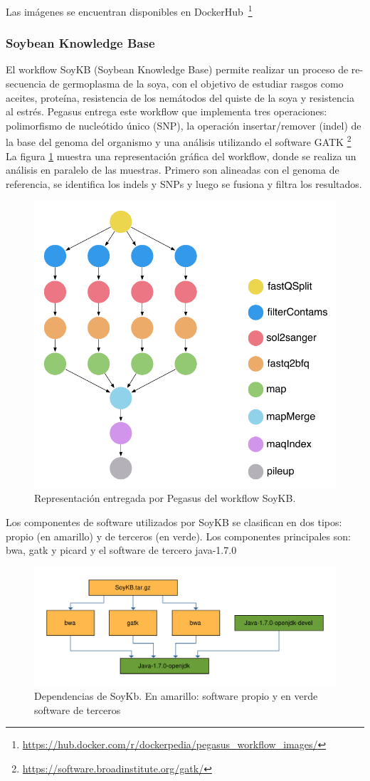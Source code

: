 Las imágenes se encuentran disponibles en DockerHub~\footnote{\url{https://hub.docker.com/r/dockerpedia/pegasus_workflow_images/}}

\subsubsection{Soybean Knowledge Base}

El workflow SoyKB (Soybean Knowledge Base) \cite{joshi2012soybean} permite realizar un proceso de re-secuencia de germoplasma de la soya, con el objetivo de estudiar rasgos como aceites, proteína, resistencia de los nemátodos del quiste de la soya y resistencia al estrés.
Pegasus entrega este workflow que implementa tres operaciones: polimorfismo de nucleótido único (SNP), la operación insertar/remover (indel) de la base del genoma del organismo y una análisis utilizando el software GATK \footnote{\url{https://software.broadinstitute.org/gatk/}}
La figura \ref{fig:soykb} muestra una representación gráfica del workflow, donde se realiza un análisis en paralelo de las muestras. Primero son alineadas con el genoma de referencia,  se identifica los indels y SNPs y luego se fusiona y filtra los resultados. 

\begin{figure}[t]
\centering
\includegraphics[width=.5\textwidth]{Figures/workflow-genome}
\caption{Representación entregada por Pegasus del workflow SoyKB.}\label{fig:soykb}
\end{figure}

Los componentes de software utilizados por SoyKB se clasifican en dos tipos: propio (en amarillo) y de terceros (en verde). Los componentes principales son: bwa, gatk y picard y el software de tercero java-1.7.0

\begin{figure}[t]
\centering
\includegraphics[width=.8\textwidth]{Figures/soykb-deps}
\caption{Dependencias de SoyKb. En amarillo: software propio y en verde software de terceros}\label{fig:modflow} 
\end{figure}

